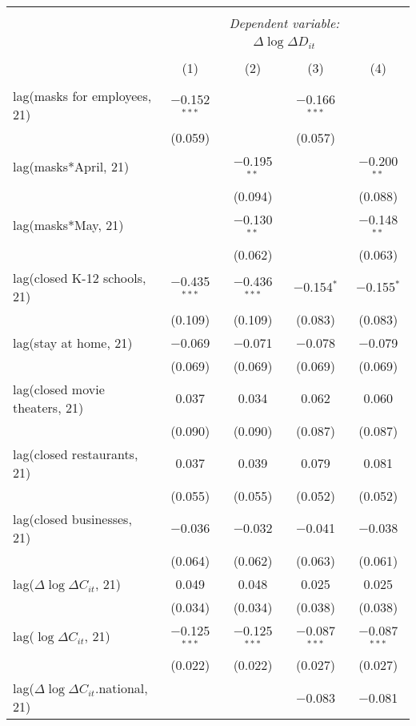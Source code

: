 \begin{tabular}{@{\extracolsep{1pt}}lcccc} 
\\[-1.8ex]\hline 
\hline \\[-1.8ex] 
 & \multicolumn{4}{c}{\textit{Dependent variable:}} \\ 
\cline{2-5} 
 & \multicolumn{4}{c}{$\Delta \log \Delta D_{it}$} \\ 
\\[-1.8ex] & (1) & (2) & (3) & (4)\\ 
\hline \\[-1.8ex] 
 lag(masks for employees, 21) & $-$0.152$^{***}$ &  & $-$0.166$^{***}$ &  \\ 
  & (0.059) &  & (0.057) &  \\ 
  lag(masks*April, 21) &  & $-$0.195$^{**}$ &  & $-$0.200$^{**}$ \\ 
  &  & (0.094) &  & (0.088) \\ 
  lag(masks*May, 21) &  & $-$0.130$^{**}$ &  & $-$0.148$^{**}$ \\ 
  &  & (0.062) &  & (0.063) \\ 
  lag(closed K-12 schools, 21) & $-$0.435$^{***}$ & $-$0.436$^{***}$ & $-$0.154$^{*}$ & $-$0.155$^{*}$ \\ 
  & (0.109) & (0.109) & (0.083) & (0.083) \\ 
  lag(stay at home, 21) & $-$0.069 & $-$0.071 & $-$0.078 & $-$0.079 \\ 
  & (0.069) & (0.069) & (0.069) & (0.069) \\ 
  lag(closed movie theaters, 21) & 0.037 & 0.034 & 0.062 & 0.060 \\ 
  & (0.090) & (0.090) & (0.087) & (0.087) \\ 
  lag(closed restaurants, 21) & 0.037 & 0.039 & 0.079 & 0.081 \\ 
  & (0.055) & (0.055) & (0.052) & (0.052) \\ 
  lag(closed businesses, 21) & $-$0.036 & $-$0.032 & $-$0.041 & $-$0.038 \\ 
  & (0.064) & (0.062) & (0.063) & (0.061) \\ 
  lag($\Delta \log \Delta C_{it}$, 21) & 0.049 & 0.048 & 0.025 & 0.025 \\ 
  & (0.034) & (0.034) & (0.038) & (0.038) \\ 
  lag($\log \Delta C_{it}$, 21) & $-$0.125$^{***}$ & $-$0.125$^{***}$ & $-$0.087$^{***}$ & $-$0.087$^{***}$ \\ 
  & (0.022) & (0.022) & (0.027) & (0.027) \\ 
  lag($\Delta \log \Delta C_{it}$.national, 21) &  &  & $-$0.083 & $-$0.081 \\ 

\end{tabular}
